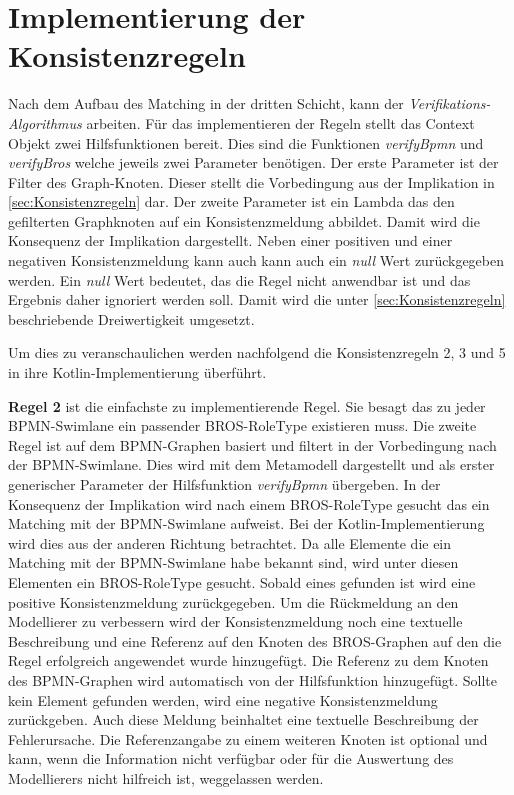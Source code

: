 \section{Implementierung der Konsistenzregeln}
\label{sec:implementaion_consistency_rules}

Nach dem Aufbau des Matching in der dritten Schicht, kann der \emph{Verifikations-Algorithmus} arbeiten.
Für das implementieren der Regeln stellt das Context Objekt zwei Hilfsfunktionen bereit.
Dies sind die Funktionen \emph{verifyBpmn} und \emph{verifyBros} welche jeweils zwei Parameter benötigen.
Der erste Parameter ist der Filter des Graph-Knoten.
Dieser stellt die Vorbedingung aus der Implikation in \cref{sec:Konsistenzregeln} dar.
Der zweite Parameter ist ein Lambda das den gefilterten Graphknoten auf ein Konsistenzmeldung abbildet.
Damit wird die Konsequenz der Implikation dargestellt.
Neben einer positiven und einer negativen Konsistenzmeldung kann auch kann auch ein \emph{null} Wert zurückgegeben werden.
Ein \emph{null} Wert bedeutet, das die Regel nicht anwendbar ist und das Ergebnis daher ignoriert werden soll.
Damit wird die unter \cref{sec:Konsistenzregeln} beschriebende Dreiwertigkeit umgesetzt.

Um dies zu veranschaulichen werden nachfolgend die Konsistenzregeln 2, 3 und 5 in ihre Kotlin-Implementierung überführt.

\textbf{Regel 2} ist die einfachste zu implementierende Regel.
Sie besagt das zu jeder BPMN-Swimlane ein passender BROS-RoleType existieren muss.
Die zweite Regel ist auf dem BPMN-Graphen basiert und filtert in der Vorbedingung nach der BPMN-Swimlane.
Dies wird mit dem Metamodell dargestellt und als erster generischer Parameter der Hilfsfunktion \emph{verifyBpmn} übergeben.
In der Konsequenz der Implikation wird nach einem BROS-RoleType gesucht das ein Matching mit der BPMN-Swimlane aufweist.
Bei der Kotlin-Implementierung wird dies aus der anderen Richtung betrachtet.
Da alle Elemente die ein Matching mit der BPMN-Swimlane habe bekannt sind, wird unter diesen Elementen ein BROS-RoleType gesucht.
Sobald eines gefunden ist wird eine positive Konsistenzmeldung zurückgegeben.
Um die Rückmeldung an den Modellierer zu verbessern wird der Konsistenzmeldung noch eine textuelle Beschreibung und eine Referenz auf den Knoten des BROS-Graphen auf den die Regel erfolgreich angewendet wurde hinzugefügt.
Die Referenz zu dem Knoten des BPMN-Graphen wird automatisch von der Hilfsfunktion hinzugefügt.
Sollte kein Element gefunden werden, wird eine negative Konsistenzmeldung zurückgeben.
Auch diese Meldung beinhaltet eine textuelle Beschreibung der Fehlerursache.
Die Referenzangabe zu einem weiteren Knoten ist optional und kann, wenn die Information nicht verfügbar oder für die Auswertung des Modellierers nicht hilfreich ist, weggelassen werden.

